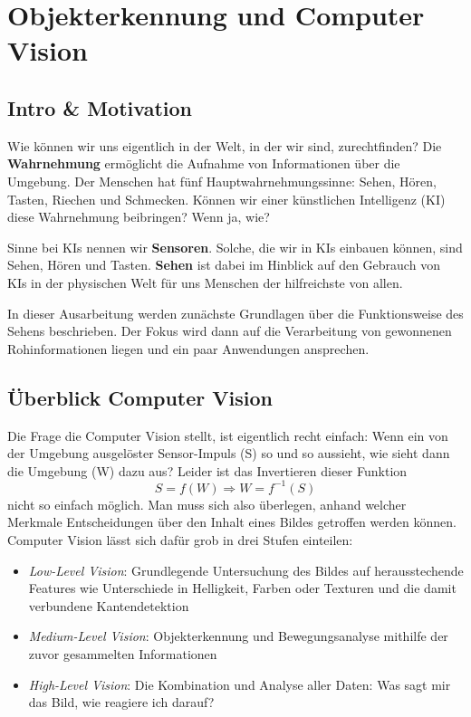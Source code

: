 
\chapter{Objekterkennung und Computer Vision}
\section{Intro \& Motivation}
Wie können wir uns eigentlich in der Welt, in der wir sind, zurechtfinden? Die \textbf{Wahrnehmung} ermöglicht die Aufnahme von Informationen über die Umgebung. Der Menschen hat fünf Hauptwahrnehmungssinne: Sehen, Hören, Tasten, Riechen und Schmecken. Können wir einer künstlichen Intelligenz (KI) diese Wahrnehmung beibringen? Wenn ja, wie?

Sinne bei KIs nennen wir \textbf{Sensoren}. Solche, die wir in KIs einbauen können, sind Sehen, Hören und Tasten. \textbf{Sehen} ist dabei im Hinblick auf den Gebrauch von KIs in der physischen Welt für uns Menschen der hilfreichste von allen.

In dieser Ausarbeitung werden zunächste Grundlagen über die Funktionsweise des Sehens beschrieben. Der Fokus wird dann auf die Verarbeitung von gewonnenen Rohinformationen liegen und ein paar Anwendungen ansprechen.

\section{Überblick Computer Vision}
Die Frage die Computer Vision stellt, ist eigentlich recht einfach: Wenn ein von der Umgebung ausgelöster Sensor-Impuls (S) so und so aussieht, wie sieht dann die Umgebung (W) dazu aus? Leider ist das Invertieren dieser Funktion
\begin{equation*}
S = f(W) \Rightarrow W = f^{-1}(S)
\end{equation*}
nicht so einfach möglich. Man muss sich also überlegen, anhand welcher Merkmale Entscheidungen über den Inhalt eines Bildes getroffen werden können. Computer Vision lässt sich dafür grob in drei Stufen einteilen:
\begin{itemize}
\item \textit{Low-Level Vision}: Grundlegende Untersuchung des Bildes auf herausstechende Features wie Unterschiede in Helligkeit, Farben oder Texturen und die damit verbundene Kantendetektion
\item \textit{Medium-Level Vision}: Objekterkennung und Bewegungsanalyse mithilfe der zuvor gesammelten Informationen
\item \textit{High-Level Vision}: Die Kombination und Analyse aller Daten: Was sagt mir das Bild, wie reagiere ich darauf?
\end{itemize}

